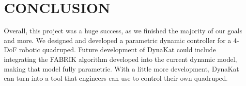 \section{CONCLUSION}
Overall, this project was a huge success, as we finished the majority of our goals and more. We designed and developed a parametric dynamic controller for a 4-DoF robotic quadruped. Future development of DynaKat could include integrating the FABRIK algorithm developed into the current dynamic model, making that model fully parametric. With a little more development, DynaKat can turn into a tool that engineers can use to control their own quadruped.